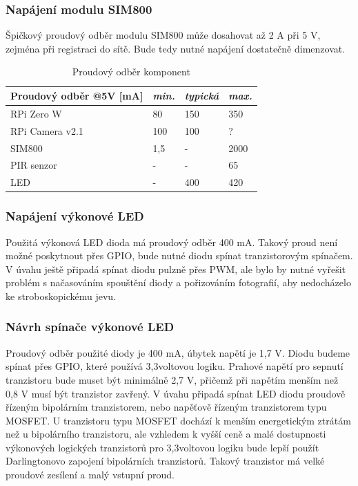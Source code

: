 \subsubsection{Napájení modulu SIM800}
Špičkový proudový odběr modulu SIM800 může dosahovat až 2 A při 5 V, zejména při registraci do sítě. Bude tedy nutné napájení dostatečně dimenzovat.

\begin{table}[h]
\centering
\caption{Proudový odběr komponent}
\label{my-label}
\begin{tabular}{|l|l|l|l|}
\hline
\textbf{Proudový odběr @5V {[}mA{]}} & \textit{min.} & \textit{typická} & \textit{max.} \\ \hline
RPi Zero W                       & 80               & 150              & 350          \\ \hline
RPi Camera v2.1                  & 100              & 100              & ?            \\ \hline
SIM800                           & 1,5              & -                & 2000         \\ \hline
PIR senzor                       & -                & -                & 65            \\ \hline
LED                              & -                & 400              & 420          \\ \hline
\end{tabular}
\end{table}

\subsubsection{Napájení výkonové LED}
Použitá výkonová LED dioda má proudový odběr 400 mA. Takový proud není možné poskytnout přes GPIO, bude nutné diodu spínat tranzistorovým spínačem. V úvahu ještě připadá spínat diodu pulzně přes PWM, ale bylo by nutné vyřešit problém s načasováním spouštění diody a pořizováním fotografií, aby nedocházelo ke stroboskopickému jevu.

\subsubsection{Návrh spínače výkonové LED}
Proudový odběr použité diody je 400 mA, úbytek napětí je 1,7 V. Diodu budeme spínat přes GPIO, které používá 3,3voltovou logiku. Prahové napětí pro sepnutí tranzistoru bude muset být minimálně 2,7 V, přičemž při napětím menším než 0,8 V musí být tranzistor zavřený. V úvahu připadá spínat LED diodu proudově řízeným bipolárním tranzistorem, nebo napěťově řízeným tranzistorem typu MOSFET. U tranzistoru typu MOSFET dochází k menším energetickým ztrátám než u bipolárního tranzistoru, ale vzhledem k vyšší ceně a malé dostupnosti výkonových logických tranzistorů pro 3,3voltovou logiku bude lepší použít Darlingtonovo zapojení bipolárních tranzistorů. Takový tranzistor má velké proudové zesílení a malý vstupní proud. 

